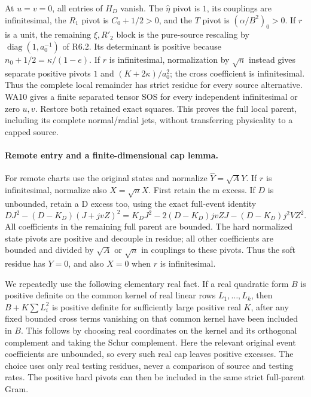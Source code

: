 At $u=v=0$, all entries of $H_D$ vanish. The $\widehat\eta$ pivot is
$1$, its couplings are infinitesimal, the $R_1$ pivot is $C_0+1/2>0$,
and the $T$ pivot is $(\alpha/B^2)_0>0$. If $r$ is a unit, the remaining
$\xi,R'_2$ block is the pure-source rescaling by $\operatorname{diag}(1,a_0^{-1})$
of R6.2. Its determinant is positive because
$n_0+1/2=\kappa/(1-e)$. If $r$ is infinitesimal, normalization by
$\sqrt n$ instead gives separate positive pivots $1$ and
$(K+2\kappa)/a_0^2$; the cross coefficient is infinitesimal.
Thus the complete local remainder has strict residue for every source
alternative. WA10 gives a finite separated tensor SOS for every
independent infinitesimal or zero $u,v$. Restore both retained exact
squares. This proves the full local parent, including its complete
normal/radial jets, without transferring physicality to a capped source.

\paragraph{Remote entry and a finite-dimensional cap lemma.}
For remote charts use the original states and normalize
$\widehat Y=\sqrt A Y$. If $r$ is infinitesimal, normalize also
$\widehat X=\sqrt nX$. First retain the m excess. If $D$ is unbounded,
retain a D excess too, using the exact full-event identity
\[
 DJ^2-(D-K_D)(J+jvZ)^2
 =K_DJ^2-2(D-K_D)jvZJ-(D-K_D)j^2VZ^2.               \tag{R7.5}
\]
All coefficients in the remaining full parent are bounded. The hard
normalized state pivots are positive and decouple in residue; all other
coefficients are bounded and divided by $\sqrt A$ or $\sqrt n$ in
couplings to these pivots. Thus the soft residue has $Y=0$, and also
$X=0$ when $r$ is infinitesimal.

We repeatedly use the following elementary real fact. If a real quadratic
form $B$ is positive definite on the common kernel of real linear rows
$L_1,\ldots,L_k$, then $B+K\sum L_i^2$ is positive definite for sufficiently
large positive real $K$, after any fixed bounded cross terms vanishing on
that common kernel have been included in $B$. This follows by choosing
real coordinates on the kernel and its orthogonal complement and taking
the Schur complement. Here the relevant original event coefficients are
unbounded, so every such real cap leaves positive excesses. The choice
uses only real testing residues, never a comparison of source and testing
rates. The positive hard pivots can then be included in the same strict
full-parent Gram.

